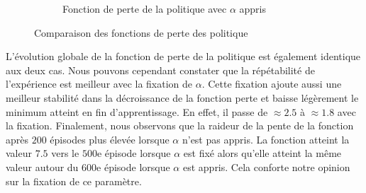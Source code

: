 \begin{figure}[H]
\begin{subfigure}{0.45\textwidth}
        \caption{Fonction de perte de la politique avec \(\alpha\) appris}
    \end{subfigure}
    \caption{Comparaison des fonctions de perte des politique}\label{fig:sac:policy_loss4}
\end{figure}

L'évolution globale de la fonction de perte de la politique est également
identique aux deux cas. Nous pouvons cependant constater que la répétabilité de l'expérience est meilleur avec la fixation de \(\alpha\). Cette fixation ajoute aussi une meilleur stabilité dans la décroissance de la fonction perte et baisse légèrement le minimum atteint en fin d'apprentissage. En effet, il passe de \(\approx 2.5\) à \(\approx 1.8\) avec la fixation. Finalement, nous observons que la raideur de la pente de la fonction après \(200\) épisodes plus élevée lorsque \(\alpha\) n'est pas appris. La fonction atteint la valeur \(7.5\) vers le \(500\)e épisode lorsque \(\alpha\) est fixé alors qu'elle atteint la même valeur autour du \(600\)e épisode lorsque \(\alpha\) est appris. Cela conforte notre opinion sur la fixation de ce paramètre.

